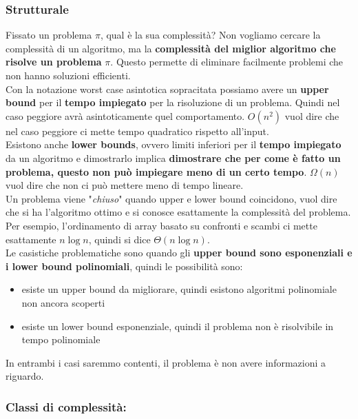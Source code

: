 \newpage

\subsubsection{Strutturale}

Fissato un problema $\pi$, qual è la sua complessità? Non vogliamo cercare la complessità di un algoritmo, ma la \textbf{complessità del miglior algoritmo che risolve un problema} $\pi$. Questo permette di eliminare facilmente problemi che non hanno soluzioni efficienti.\\

Con la notazione worst case asintotica sopracitata possiamo avere un \textbf{upper bound} per il \textbf{tempo impiegato} per la risoluzione di un problema. Quindi nel caso peggiore avrà asintoticamente quel comportamento. $O(n^2)$ vuol dire che nel caso peggiore ci mette tempo quadratico rispetto all'input.\\

Esistono anche \textbf{lower bounds}, ovvero limiti inferiori per il \textbf{tempo impiegato} da un algoritmo e dimostrarlo implica \textbf{dimostrare che per come è fatto un problema, questo non può impiegare meno di un certo tempo}. $\Omega(n)$ vuol dire che non ci può mettere meno di tempo lineare.\\

Un problema viene "\textit{chiuso}" quando upper e lower bound coincidono, vuol dire che si ha l'algoritmo ottimo e si conosce esattamente la complessità del problema. Per esempio, l'ordinamento di array basato su confronti e scambi ci mette esattamente $n \log n$, quindi si dice $\Theta(n \log n)$.\\

Le casistiche problematiche sono quando gli \textbf{upper bound sono esponenziali e i lower bound polinomiali}, quindi le possibilità sono: 
\begin{itemize}
	\item esiste un upper bound da migliorare, quindi esistono algoritmi polinomiale non ancora scoperti
	\item esiste un lower bound esponenziale, quindi il problema non è risolvibile in tempo polinomiale
\end{itemize}

In entrambi i casi saremmo contenti, il problema è non avere informazioni a riguardo.\\

\newpage

\subsubsection{Classi di complessità:} 

